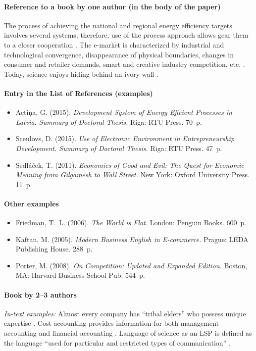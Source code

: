 \paragraph{Reference to a book by one author (in the body of the paper)} The process of achieving the national and regional energy efficiency targets involves several systems, therefore, use of the process approach allows gear them to a closer cooperation \parencite[26]{actina2015}. The e-market is characterized by industrial and technological convergence, disappearance of physical boundaries, changes in consumer and retailer demands, smart and creative industry competition, etc. \parencite[19]{sceulovs2015}. Today, science enjoys hiding behind an ivory wall \parencite[11]{sedlacek2011}.

\paragraph{Entry in the List of References (examples)}%
\begin{itemize}
  \item Actiņa, G. (2015). \emph{Development System of Energy Eficient Processes in Latvia. Summary of Doctoral Thesis.} Riga: RTU Press. 70~p.
  \item Sceulovs, D. (2015). \emph{Use of Electronic Environment in Entrepreneurship Development. Summary of Doctoral Thesis.} Riga: RTU Press. 47~p.
  \item Sedláček, T. (2011). \emph{Economics of Good and Evil: The Quest for Economic Meaning from Gilgamesh to Wall Street.} New York: Oxford University Press. 11~p.
\end{itemize}

\paragraph{Other examples}
\begin{itemize}
  \item Friedman, T.~L. (2006). \emph{The World is Flat.} London: Penguin Books. 600~p.
  \item Kaftan, M. (2005). \emph{Modern Business English in E-commerce.} Prague: LEDA Publishing House. 288~p.
  \item Porter, M. (2008). \emph{On Competition: Updated and Expanded Edition.} Boston, MA: Harvard Business School Pub. 544~p.
\end{itemize}

\paragraph{Book by 2--3 authors}
\emph{In-text examples:} Almost every company has ``tribal elders'' who possess unique expertise \parencite[183]{schmidt2014}. Cost accounting provides information for both management accounting and financial accounting \parencite[4]{horngren2015}. Language of science as an LSP is defined as the language ``used for particular and restricted types of communication'' \parencite[159]{richards1985}.


